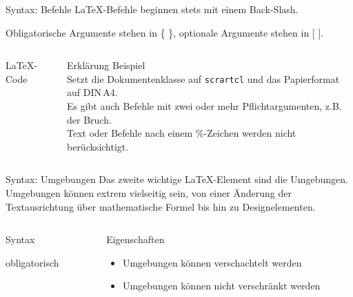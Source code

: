 \begin{frame}[fragile]{Syntax: Befehle}
  \LaTeX-Befehle beginnen stets mit einem Back-Slash.

  Obligatorische Argumente stehen in \{ \}, optionale Argumente stehen in [ ].
  \begin{columns}[T]
    \begin{column}{0.53\textwidth}
      \begin{block}{\LaTeX-Code}
      \end{block}
    \end{column}
    \begin{column}{0.41\textwidth}
      \begin{block}{Erklärung}
        Beispiel \\
        Setzt die Dokumentenklasse auf \texttt{scrartcl} und das Papierformat auf DIN\,A4. \\
        Es gibt auch Befehle mit zwei oder mehr Pflichtargumenten, z.B. der Bruch. \\
        Text oder Befehle nach einem \%-Zeichen werden nicht berücksichtigt.
      \end{block}
    \end{column}
  \end{columns}
\end{frame}

\begin{frame}[fragile]{Syntax: Umgebungen}
  Das zweite wichtige \LaTeX-Element sind die Umgebungen.
  Umgebungen können extrem vielseitig sein, von einer Änderung der Textausrichtung über mathematische Formel bis hin zu Designelementen.
  \begin{columns}[T]
    \begin{column}{0.47\textwidth}
      \begin{block}{Syntax}
        \begin{lstverbatim}
        \begin{Umgebung}[optional]
            {obligatorisch}
        \end{Umgebung}
        \end{lstverbatim}
      \end{block}
    \end{column}
    \begin{column}{0.47\textwidth}
      \begin{block}{Eigenschaften}
        \begin{itemize}
          \item Umgebungen können verschachtelt werden
          \item Umgebungen können \alert{nicht} verschränkt werden
        \end{itemize}
      \end{block}
    \end{column}
  \end{columns}
\end{frame}

